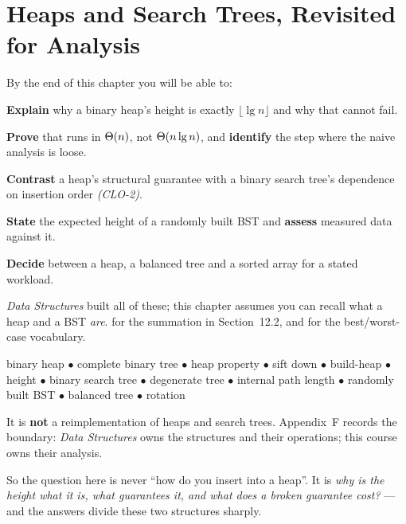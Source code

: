\chapter{Heaps and Search Trees, Revisited for Analysis}\label{ch:structures}

\begin{outcomes}
By the end of this chapter you will be able to:
\begin{tight}
  \item \textbf{Explain} why a binary heap's height is exactly
        $\lfloor \lg n \rfloor$ and why that cannot fail.
  \item \textbf{Prove} that  runs in $\Theta(n)$, not
        $\Theta(n \operatorname{lg} n)$, and \textbf{identify} the step where the naive
        analysis is loose.
  \item \textbf{Contrast} a heap's structural guarantee with a binary search
        tree's dependence on insertion order \emph{(CLO-2)}.
  \item \textbf{State} the expected height of a randomly built BST and
        \textbf{assess} measured data against it.
  \item \textbf{Decide} between a heap, a balanced tree and a sorted array for
        a stated workload.
\end{tight}
\end{outcomes}

\begin{prereq}
\emph{Data Structures} built all of these; this chapter assumes you can recall
what a heap and a BST \emph{are}.  for the summation in
Section~12.2, and  for the best/worst-case vocabulary.
\end{prereq}

\begin{keyterms}
binary heap $\bullet$ complete binary tree $\bullet$ heap property $\bullet$
sift down $\bullet$ build-heap $\bullet$ height $\bullet$ binary search tree
$\bullet$ degenerate tree $\bullet$ internal path length $\bullet$ randomly
built BST $\bullet$ balanced tree $\bullet$ rotation
\end{keyterms}

\begin{alertbox}
It is \textbf{not} a reimplementation of heaps and search trees. Appendix~F
records the boundary: \emph{Data Structures} owns the structures and their
operations; this course owns their analysis.

\smallskip
So the question here is never ``how do you insert into a heap''. It is
\emph{why is the height what it is, what guarantees it, and what does a broken
guarantee cost?} --- and the answers divide these two structures sharply.
\end{alertbox}

